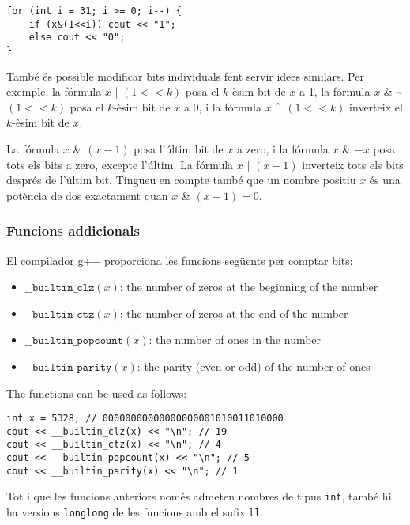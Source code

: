 \begin{lstlisting}
for (int i = 31; i >= 0; i--) {
    if (x&(1<<i)) cout << "1";
    else cout << "0";
}
\end{lstlisting}


També és possible modificar bits individuals fent servir idees
similars. Per exemple, la fórmula $x$ | $(1 < < k)$ posa el $k$-èsim
bit de $x$ a 1, la fórmula $x$ \& \textasciitilde $(1 < < k)$ posa el
$k$-èsim bit de $x$ a 0, i la fórmula $x$ $\XOR$ $(1 < < k)$
inverteix el $k$-èsim bit de $x$.

La fórmula $x$ \& $(x-1)$ posa l'últim bit de $x$ a zero, i la fórmula
$x$ \& $-x$ posa tots els bits a zero, excepte l'últim. La
fórmula $x$ | $(x-1)$ inverteix tots els bits després de l'últim
bit. Tingueu en compte també que un nombre positiu $x$ és una potència
de dos exactament quan $x$ \& $(x-1) = 0$.

\subsubsection*{Funcions addicionals}

El compilador g++ proporciona les funcions següents per comptar bits:


\begin{itemize}
\item
$\texttt{\_\_builtin\_clz}(x)$:
the number of zeros at the beginning of the number
\item
$\texttt{\_\_builtin\_ctz}(x)$:
the number of zeros at the end of the number
\item
$\texttt{\_\_builtin\_popcount}(x)$:
the number of ones in the number
\item
$\texttt{\_\_builtin\_parity}(x)$:
the parity (even or odd) of the number of ones
\end{itemize}

\begin{samepage}

The functions can be used as follows:
\begin{lstlisting}
int x = 5328; // 00000000000000000001010011010000
cout << __builtin_clz(x) << "\n"; // 19
cout << __builtin_ctz(x) << "\n"; // 4
cout << __builtin_popcount(x) << "\n"; // 5
cout << __builtin_parity(x) << "\n"; // 1
\end{lstlisting}
\end{samepage}


Tot i que les funcions anteriors només admeten nombres de tipus
\texttt{int}, també hi ha versions \texttt{longlong} de les funcions
amb el sufix \texttt{ll}.


